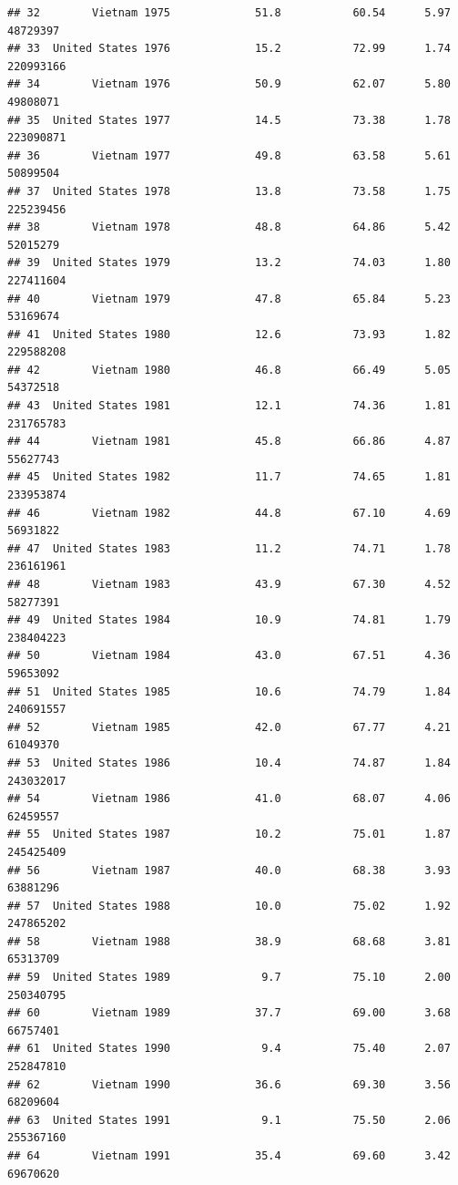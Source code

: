 \documentclass[
]{article}
\begin{document}
\begin{verbatim}
## 32        Vietnam 1975             51.8           60.54      5.97   48729397
## 33  United States 1976             15.2           72.99      1.74  220993166
## 34        Vietnam 1976             50.9           62.07      5.80   49808071
## 35  United States 1977             14.5           73.38      1.78  223090871
## 36        Vietnam 1977             49.8           63.58      5.61   50899504
## 37  United States 1978             13.8           73.58      1.75  225239456
## 38        Vietnam 1978             48.8           64.86      5.42   52015279
## 39  United States 1979             13.2           74.03      1.80  227411604
## 40        Vietnam 1979             47.8           65.84      5.23   53169674
## 41  United States 1980             12.6           73.93      1.82  229588208
## 42        Vietnam 1980             46.8           66.49      5.05   54372518
## 43  United States 1981             12.1           74.36      1.81  231765783
## 44        Vietnam 1981             45.8           66.86      4.87   55627743
## 45  United States 1982             11.7           74.65      1.81  233953874
## 46        Vietnam 1982             44.8           67.10      4.69   56931822
## 47  United States 1983             11.2           74.71      1.78  236161961
## 48        Vietnam 1983             43.9           67.30      4.52   58277391
## 49  United States 1984             10.9           74.81      1.79  238404223
## 50        Vietnam 1984             43.0           67.51      4.36   59653092
## 51  United States 1985             10.6           74.79      1.84  240691557
## 52        Vietnam 1985             42.0           67.77      4.21   61049370
## 53  United States 1986             10.4           74.87      1.84  243032017
## 54        Vietnam 1986             41.0           68.07      4.06   62459557
## 55  United States 1987             10.2           75.01      1.87  245425409
## 56        Vietnam 1987             40.0           68.38      3.93   63881296
## 57  United States 1988             10.0           75.02      1.92  247865202
## 58        Vietnam 1988             38.9           68.68      3.81   65313709
## 59  United States 1989              9.7           75.10      2.00  250340795
## 60        Vietnam 1989             37.7           69.00      3.68   66757401
## 61  United States 1990              9.4           75.40      2.07  252847810
## 62        Vietnam 1990             36.6           69.30      3.56   68209604
## 63  United States 1991              9.1           75.50      2.06  255367160
## 64        Vietnam 1991             35.4           69.60      3.42   69670620

\end{verbatim}
\end{document}
